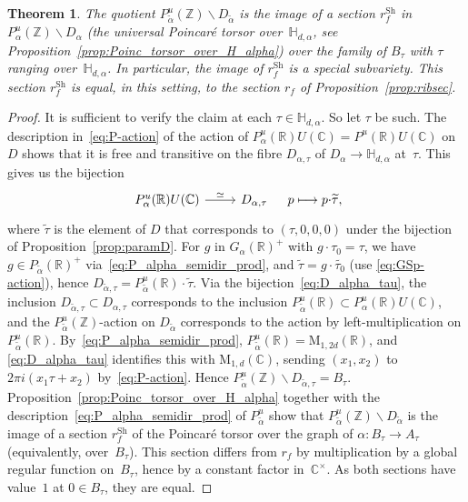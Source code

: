 \documentclass[JEP,XML,SOM,Unicode,NoFloatCountersInSection]{cedram}
\def\mto{\mathchoice{\longmapsto}{\mapsto}{\mapsto}{\mapsto}}
\theoremstyle{plain}
\newtheorem{Theorem}[subsection]{Theorem}
\theoremstyle{definition}
\numberwithin{equation}{subsection}
\renewcommand{\C}{\mathbb C}
\newcommand{\R}{\mathbb R}
\newcommand{\Z}{\mathbb Z}
\renewcommand{\H}{\mathbb H}
\newcommand{\rmM}{\mathrm{M}}
\newcommand{\Sh}{\mathrm{Sh}}
\begin{document}
\begin{Theorem}\label{thm:RibetsectionMSV}
The quotient $P_{\tilde{\alpha}}^u(\Z)\backslash D_{\tilde{\alpha}}$
is the image of a section $r^\Sh_f$ in $P_\alpha^u(\Z)\backslash
D_\alpha$ (the universal Poincaré torsor over~$\H_{d,\alpha}$, see
Proposition~\ref{prop:Poinc_torsor_over_H_alpha}) over the family of
$B_\tau$ with $\tau$ ranging over~$\H_{d,\alpha}$. In particular,
the image of $r^\Sh_f$ is a special subvariety. This section $r^\Sh_f$
is equal, in this setting, to the section $r_f$ of
Proposition~\ref{prop:ribsec}.
\end{Theorem}
\begin{proof}
It is sufficient to verify the claim at each
$\tau\in\H_{d,\alpha}$. So let $\tau$ be such. The description
in~\eqref{eq:P-action} of the action of
$P^u_\alpha(\R)U(\C)=P^u(\R)U(\C)$ on $D$ shows that it is free and
transitive on the fibre $D_{\alpha,\tau}$ of
$D_\alpha\to\H_{d,\alpha}$ at~$\tau$. This gives us the bijection
\begin{equation}\label{eq:D_alpha_tau}
\begin{tikzcd}
P^u_\alpha(\R)U(\C) \ar[r,"\simeq"] & D_{\alpha,\tau}
\end{tikzcd}\,\quad
p\mto p{\cdot}\widetilde{\tau},
\end{equation}
where $\widetilde{\tau}$ is the element of $D$ that corresponds to
$(\tau,0,0,0)$ under the bijection of Proposition~\ref{prop:paramD}.
For $g$ in $G_\alpha(\R)^+$ with $g{\cdot}\tau_0=\tau$, we have $g\in
P_{\widetilde{\alpha}}(\R)^+$ via~\eqref{eq:P_alpha_semidir_prod}, and
$\widetilde{\tau}=g{\cdot}\widetilde{\tau_0}$ (use
\eqref{eq:GSp-action}), hence
$D_{\widetilde{\alpha},\tau}=P^u_{\widetilde{\alpha}}(\R){\cdot}\widetilde{\tau}$.
Via the bijection~\eqref{eq:D_alpha_tau}, the inclusion
$D_{\widetilde{\alpha},\tau}\subset D_{\alpha,\tau}$ corresponds to
the inclusion $P^u_{\widetilde{\alpha}}(\R)\subset
P^u_\alpha(\R)U(\C)$, and the $P^u_{\widetilde{\alpha}}(\Z)$-action on
$D_{\tilde{\alpha}}$ corresponds to the action by left-multiplication
on $P^u_{\widetilde{\alpha}}(\R)$. By~\eqref{eq:P_alpha_semidir_prod},
$P^u_{\widetilde{\alpha}}(\R)=\rmM_{1,2d}(\R)$, and
\eqref{eq:D_alpha_tau} identifies this with $\rmM_{1,d}(\C)$, sending
$(x_1,x_2)$ to $2\pi i(x_1\tau + x_2)$ by~\eqref{eq:P-action}. Hence
$P_{\widetilde{\alpha}}^u(\Z)\backslash
D_{\widetilde{\alpha},\tau}=B_\tau$.
Proposition~\ref{prop:Poinc_torsor_over_H_alpha} together with the
description~\eqref{eq:P_alpha_semidir_prod} of
$P_{\widetilde{\alpha}}^u$ show that
$P_{\tilde{\alpha}}^u(\Z)\backslash D_{\tilde{\alpha}}$ is the image
of a section $r^\Sh_f$ of the Poincaré torsor over the graph of
$\alpha\colon B_\tau\to A_\tau$ (equivalently, over~$B_\tau$). This
section differs from $r_f$ by multiplication by a global regular
function on~$B_\tau$, hence by a constant factor in~$\C^\times$. As
both sections have value~$1$ at $0\in B_\tau$, they are equal.
\end{proof}
\end{document}

